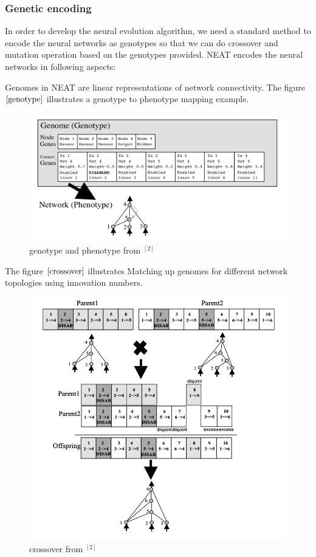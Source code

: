 \documentclass{article}
\begin{document}
\subsubsection{Genetic encoding}

In order to develop the neural evolution algorithm, we need a standard method to encode the neural networks as genotypes so that we can
do crossover and mutation operation based on the genotypes provided. NEAT encodes the neural networks in following aspects:

Genomes in NEAT are linear representations of network connectivity. The figure $\ref{genotype}$ illustrates a genotype to phenotype mapping example. 

\begin{figure}[htbp]
  \centering
  \includegraphics[width = .6\textwidth]{genome}
  \caption{genotype and phenotype from $^{[2]}$}
  \label{genotype}
\end{figure}

The figure $\ref{crossover}$ illustrates Matching up genomes for different network topologies using innovation numbers. 
 \begin{figure}[htbp]
  \centering
  \includegraphics[width = .75\textwidth]{crossover}
  \caption{crossover from $^{[2]}$}
  \label{crossover}
\end{figure}
\end{document}
